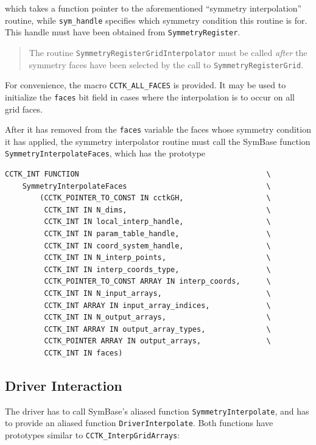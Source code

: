 which takes a function pointer to the aforementioned ``symmetry
interpolation'' routine, while \texttt{sym\_handle} specifies which
symmetry condition this routine is for.  This handle must have been
obtained from \texttt{SymmetryRegister}.

\begin{quote}
  The routine \texttt{SymmetryRegisterGridInterpolator} must be called
  \emph{after} the symmetry faces have been selected by the call to
  \texttt{SymmetryRegisterGrid}.
\end{quote}

For convenience, the macro \texttt{CCTK\_ALL\_FACES} is provided.
It may be used to initialize the \texttt{faces} bit field in cases
where the interpolation is to occur on all grid faces.

After it has removed from the \texttt{faces} variable the faces whose
symmetry condition it has applied, the symmetry interpolator routine
must call the SymBase function \texttt{SymmetryInterpolateFaces}, which
has the prototype

\begin{verbatim}
CCTK_INT FUNCTION                                           \
    SymmetryInterpolateFaces                                \
        (CCTK_POINTER_TO_CONST IN cctkGH,                   \
         CCTK_INT IN N_dims,                                \
         CCTK_INT IN local_interp_handle,                   \
         CCTK_INT IN param_table_handle,                    \
         CCTK_INT IN coord_system_handle,                   \
         CCTK_INT IN N_interp_points,                       \
         CCTK_INT IN interp_coords_type,                    \
         CCTK_POINTER_TO_CONST ARRAY IN interp_coords,      \
         CCTK_INT IN N_input_arrays,                        \
         CCTK_INT ARRAY IN input_array_indices,             \
         CCTK_INT IN N_output_arrays,                       \
         CCTK_INT ARRAY IN output_array_types,              \
         CCTK_POINTER ARRAY IN output_arrays,               \
         CCTK_INT IN faces)
\end{verbatim}



\subsection{Driver Interaction}
\label{SymBase.driver_interaction}

The driver has to call SymBase's aliased function
\texttt{SymmetryInterpolate}, and has to provide an aliased function
\texttt{DriverInterpolate}.  Both functions have prototypes similar to 
\texttt{CCTK\_InterpGridArrays}:


